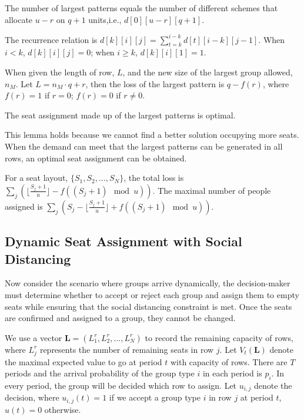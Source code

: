 The number of largest patterns equals the number of different schemes that allocate $u-r$ on $q+1$ units,i.e., $d[0][u-r][q+1]$.

The recurrence relation is $d[k][i][j] = \sum_{t=k}^{i-k} d[t][i-k][j-1]$. 
When $i < k$, $d[k][i][j] =0$; when $i \geq k$, $d[k][i][1] =1$.

\begin{lem}
When given the length of row, $L$, and the new size of the largest group allowed, $n_M$. Let $L = n_M \cdot q + r$, then the loss of the largest pattern is $q - f(r)$, where $f(r) =1$ if $r=0$; $f(r) =0$ if $r \neq 0$.
\end{lem}

\begin{lem}
The seat assignment made up of the largest patterns is optimal.
\end{lem}

This lemma holds because we cannot find a better solution occupying more seats. When the demand can meet that the largest patterns can be generated in all rows, an optimal seat assignment can be obtained.

\begin{prop}
For a seat layout, $\{S_1, S_2, \ldots, S_{N}\}$, the total loss is $\sum_{j} (\lfloor \frac{S_j+1}{u} \rfloor - f((S_j +1)\mod u))$. The maximal number of people assigned is $\sum_{j} (S_j - \lfloor \frac{S_j+1}{u} \rfloor + f((S_j +1)\mod u))$.
\end{prop}

\subsection{Dynamic Seat Assignment with Social Distancing}\label{sec_dynamic}


Now consider the scenario where groups arrive dynamically, the decision-maker must determine whether to accept or reject each group and assign them to empty seats while ensuring that the social distancing constraint is met. Once the seats are confirmed and assigned to a group, they cannot be changed.

We use a vector $\mathbf{L}= (L^{r}_1, L^{r}_2, \ldots, L^{r}_{N})$ to record the remaining capacity of rows, where $L^{r}_{j}$ represents the number of remaining seats in row $j$. Let $V_{t}(\mathbf{L})$ denote the maximal expected value to go at period $t$ with capacity of rows. There are $T$ periods and the arrival probability of the group type $i$ in each period is $p_i$. In every period, the group will be decided which row to assign. Let $u_{i,j}$ denote the decision, where $u_{i,j}(t) = 1$ if we accept a group type $i$ in row $j$ at period $t$, $u(t) =0$ otherwise.


